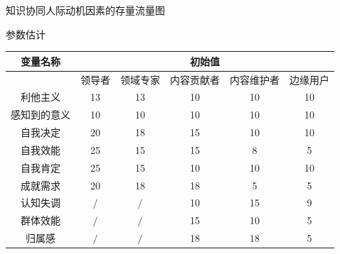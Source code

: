 \documentclass[slidestop,compress,mathserif,table]{beamer}
\begin{document}
 \begin{frame}{知识协同人际动机因素的存量流量图}
   \end{frame}

   \begin{frame}{参数估计}
\scriptsize
    \begin{tabular}{|c|c|c|c|c|c|}
\hline
\multicolumn{ 1}{|c|}{变量名称} &                                     \multicolumn{ 5}{|c|}{初始值} \\
\hline
\multicolumn{ 1}{|c|}{} &        领导者 &       领域专家 &      内容贡献者 &      内容维护者 &       边缘用户 \\
\hline
      利他主义 &      13      &        13    &        10    &   10         &      10      \\
\hline
    感知到的意义 &      10      &     10       &     10       &   10         &      10      \\
\hline
      自我决定 &      20      &     18       &      15      &          10  &    10        \\
\hline
      自我效能 &     25       &      15      &        15    &        8    &       5     \\
\hline
      自我肯定 &      25      &    15        &     10       &      10      &       10     \\
\hline
      成就需求 &     20       &     18       &      18      &      5      &        5    \\
\hline
      认知失调 &     $\slash$       &       $\slash$       &      10      &       15     &      9      \\
\hline
      群体效能 &     $\slash$         &          $\slash$    &    15        &      10      &       5     \\
\hline
       归属感 &       $\slash$       &     $\slash$         &      18      &        18    &        5    \\\hline
\end{tabular}  

   \end{frame}
\end{document}
